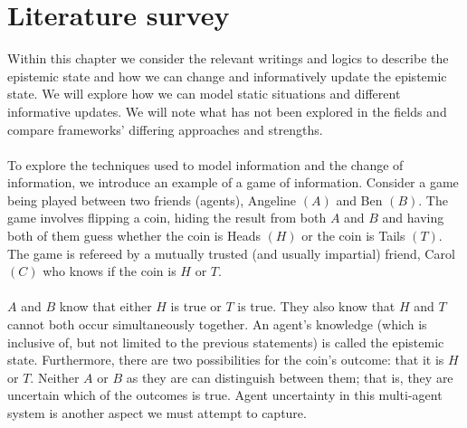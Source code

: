 \chapter{Literature survey} \label{lit_survey}

Within this chapter we consider the relevant writings and logics to describe
the epistemic state and how we can change and informatively update the epistemic
state.
We will explore how we can model static situations and
different informative updates.
We will note what has not been explored in the fields and compare frameworks'
differing approaches and strengths.\\
\\
To explore the techniques used to model information and the change of information, we introduce an
example of a game of information.
Consider a game being played between two friends (agents), Angeline $(A)$
and Ben $(B)$.
The game involves flipping a coin, hiding the result from both $A$ and $B$ and
having both of them guess whether the coin is Heads $(H)$ or the coin is Tails
$(T)$.
The game is refereed by a mutually trusted (and usually impartial) friend, Carol
$(C)$ who knows if the coin is $H$ or $T$.\\
\\
$A$ and $B$ know that either $H$ is true or $T$ is true.
They also know that $H$ and $T$ cannot both occur simultaneously together.
An agent's knowledge (which is inclusive of, but not limited to the previous
statements) is called the epistemic state.
Furthermore, there are two possibilities for the coin's outcome: that it is $H$
or $T$.
Neither $A$ or $B$ as they are can distinguish between them; that is, they are
uncertain which of the outcomes is true.
Agent uncertainty in this multi-agent system is another aspect we must attempt
to capture.


